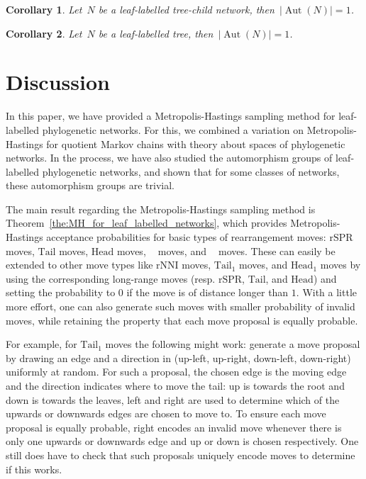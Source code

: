 \documentclass{article}
\newtheorem{corollary}{Corollary}
\theoremstyle{definition}
\DeclareMathOperator{\Aut}{Aut}
\DeclareMathOperator{\VM}{Vert^{--}}
\DeclareMathOperator{\VP}{Vert^+}
\newcommand{\Tail}{\mathrm{Tail}}
\newcommand{\Head}{\mathrm{Head}}
\newcommand{\rSPR}{\mathrm{rSPR}}
\newcommand{\rNNI}{\mathrm{rNNI}}
\begin{document}
\begin{corollary}
Let~$N$ be a leaf-labelled tree-child network, then~$|\Aut(N)| = 1$.
\end{corollary}

\begin{corollary}
Let~$N$ be a leaf-labelled tree, then~$|\Aut(N)| = 1$.
\end{corollary}


\section{Discussion}
In this paper, we have provided a Metropolis-Hastings sampling method for leaf-labelled phylogenetic networks. For this, we combined a variation on Metropolis-Hastings for quotient Markov chains with theory about spaces of phylogenetic networks. In the process, we have also studied the automorphism groups of leaf-labelled phylogenetic networks, and shown that for some classes of networks, these automorphism groups are trivial.

The main result regarding the Metropolis-Hastings sampling method is Theorem~\ref{the:MH_for_leaf_labelled_networks}, which provides Metropolis-Hastings acceptance probabilities for basic types of rearrangement moves: $\rSPR$ moves, $\Tail$ moves, $\Head$ moves, $\VP$ moves, and $\VM$ moves. These can easily be extended to other move types like $\rNNI$ moves, $\Tail_1$ moves, and $\Head_1$ moves by using the corresponding long-range moves (resp. $\rSPR$, $\Tail$, and $\Head$) and setting the probability to $0$ if the move is of distance longer than $1$. With a little more effort, one can also generate such moves with smaller probability of invalid moves, while retaining the property that each move proposal is equally probable. 

For example, for $\Tail_1$ moves the following might work: generate a move proposal by drawing an edge and a direction in (up-left, up-right, down-left, down-right) uniformly at random. For such a proposal, the chosen edge is the moving edge and the direction indicates where to move the tail: up is towards the root and down is towards the leaves, left and right are used to determine which of the upwards or downwards edges are chosen to move to. To ensure each move proposal is equally probable, right encodes an invalid move whenever there is only one upwards or downwards edge and up or down is chosen respectively. One still does have to check that such proposals uniquely encode moves to determine if this works.
\end{document}
